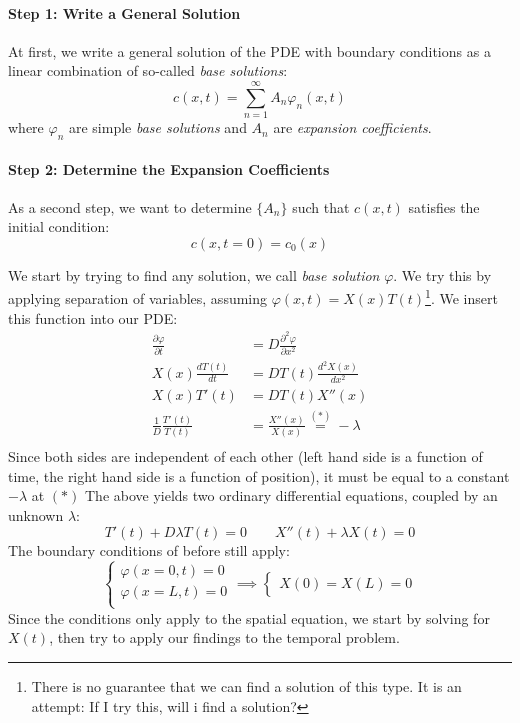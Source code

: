 \paragraph{Step 1: Write a General Solution} At first, we write a general solution of the PDE with boundary conditions as a linear combination of so-called \textit{base solutions}:
\begin{equation*}
	c(x,t)  = \sum_{n=1}^\infty A_n\varphi_n(x,t)
\end{equation*}
where $\varphi_n$ are simple \textit{base solutions} and $A_n$ are \textit{expansion coefficients}.

\paragraph{Step 2: Determine the Expansion Coefficients} As a second step, we want to determine $\{A_n\}$ such that $c(x,t)$ satisfies the initial condition:
\begin{equation*}
	c(x,t=0)=c_0(x)
\end{equation*}

We start by trying to find any solution, we call \textit{base solution} $\varphi$. We try this by applying separation of variables, assuming $\varphi(x,t)=X(x)T(t)$\footnote{There is no guarantee that we can find a solution of this type. It is an attempt: If I try this, will i find a solution?}. We insert this function into our PDE:
\begin{equation*}
	\begin{split}
		\frac{\partial \varphi}{\partial t} &= D \frac{\partial^2 \varphi}{\partial x^2}\\
		X(x)\frac{dT(t)}{dt}&=DT(t)\frac{d^2 X(x)}{dx^2}\\
		X(x)T'(t)&=DT(t)X''(x)\\
		\frac 1D \frac{T'(t)}{T(t)} &= \frac{X''(x)}{X(x)} \stackrel{(*)}{=}-\lambda\\
	\end{split}
\end{equation*}
Since both sides are independent of each other (left hand side is a function of time, the right hand side is a function of position), it must be equal to a constant $-\lambda$ at $(*)$
The above yields two ordinary differential equations, coupled by an unknown $\lambda$:
\begin{equation*}
		T'(t)+ D\lambda T(t) = 0
		\qquad
		X''(t) + \lambda X(t) = 0
\end{equation*}
The boundary conditions of before still apply:
\begin{equation*}
	\begin{cases}
		\varphi(x=0, t) = 0\\
		\varphi(x=L, t) = 0\\
	\end{cases}\implies
	\begin{cases}
		X(0)=X(L) = 0
	\end{cases}
\end{equation*}
Since the conditions only apply to the spatial equation, we start by solving for $X(t)$, then try to apply our findings to the temporal problem.


